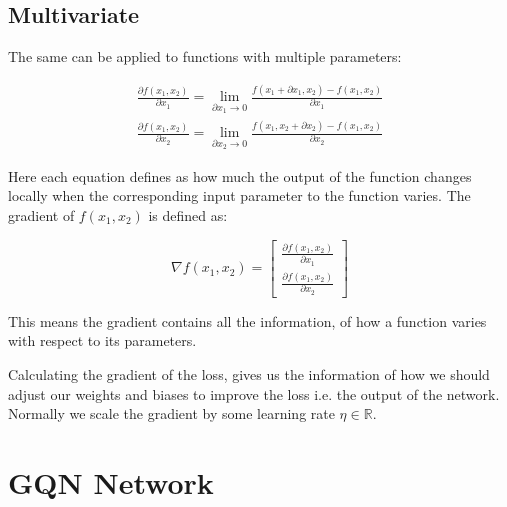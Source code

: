 \subsection{Multivariate}
The same can be applied to functions with multiple parameters:

\begin{equation}
\begin{split}
	\frac{\partial f(x_1, x_2)}{\partial x_1} = \lim_{\partial x_1 \to 0}\frac{f(x_1 + \partial x_1, x_2) - f(x_1, x_2)}{\partial x_1} \\
	\frac{\partial f(x_1, x_2)}{\partial x_2} = \lim_{\partial x_2 \to 0}\frac{f(x_1, x_2 + \partial x_2) - f(x_1, x_2)}{\partial x_2}
\end{split}
\end{equation}

Here each equation defines as how much the output of the function changes locally when the corresponding input parameter to the function varies.
The gradient of $f(x_1, x_2)$ is defined as:

\begin{equation}
\nabla f(x_1, x_2) =
	\begin{bmatrix}
	\frac{\partial f(x_1, x_2)}{\partial x_1} \\[2mm]
	\frac{\partial f(x_1, x_2)}{\partial x_2}
	\end{bmatrix}
\end{equation}

This means the gradient contains all the information, of how a function varies with respect to its parameters.

Calculating the gradient of the loss, gives us the information of how we should adjust our weights and biases to improve the loss i.e. the output of the network. Normally we scale the gradient by some learning rate $\eta \in \mathbb{R}$.




\section{GQN Network}\label{BackgroundGQN}
